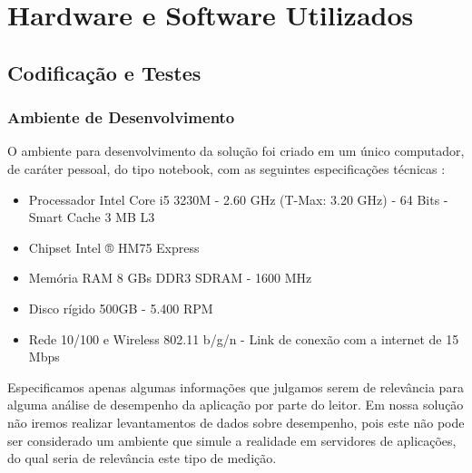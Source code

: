 \chapter{Hardware e Software Utilizados}

\section{Codificação e Testes}
\subsection{Ambiente de Desenvolvimento}
O ambiente para desenvolvimento da solução foi criado em um único computador, de caráter pessoal, do tipo notebook, com as seguintes especificações técnicas \cite{notebook-info}:
	\begin{itemize}
		\item Processador Intel Core i5 3230M - 2.60 GHz (T-Max: 3.20 GHz) - 64 Bits - Smart Cache 3 MB L3
	\end{itemize}
	\begin{itemize}
		\item Chipset Intel ® HM75 Express
	\end{itemize}
	\begin{itemize}
		\item Memória RAM 8 GBs DDR3 SDRAM - 1600 MHz
	\end{itemize}
	\begin{itemize}
		\item Disco rígido 500GB - 5.400 RPM
	\end{itemize}
	\begin{itemize}
		\item Rede 10/100 e Wireless 802.11 b/g/n - Link de conexão com a internet de 15 Mbps
	\end{itemize}

Especificamos apenas algumas informações que julgamos serem de relevância para alguma análise de desempenho da aplicação por parte do leitor. Em nossa solução não iremos realizar levantamentos de dados sobre desempenho, pois este não pode ser considerado um ambiente que simule a realidade em servidores de aplicações, do qual seria de relevância este tipo de medição.


